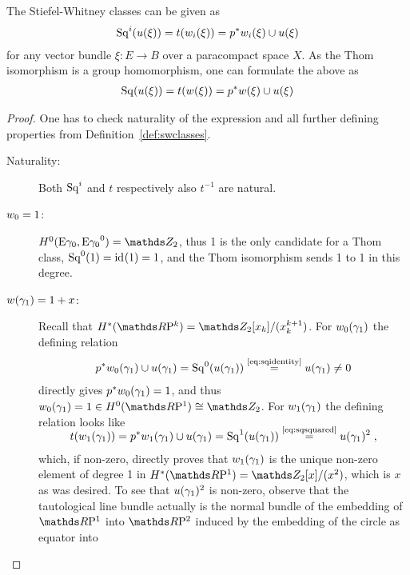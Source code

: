 \begin{Thm}\label{thm:altdefswclasses}
  The Stiefel-Whitney classes can be given as
  \begin{gather*}
    \mathrm{Sq}^{i}({u}(\xi)) = t({w_{i}}(\xi)) = {p}^* {w_{i}}(\xi) \cup {u}(\xi)
  \end{gather*}
  for any vector bundle $\xi\colon E\to B$ over a paracompact space
  $X$. As the Thom isomorphism is a group homomorphism, one can
  formulate the above as
  \begin{gather*}
    \mathrm{Sq}({u}(\xi)) = t({w}(\xi)) = {p}^* {w}(\xi) \cup {u}(\xi)
  \end{gather*}
  \begin{proof}
    One has to check naturality of the expression and all further
    defining properties from Definition~\ref{def:swclasses}.
    \begin{description}
    \item[Naturality:] Both $\mathrm{Sq}^{i}$ and $t$ respectively also $t^{-1}$
      are natural.
    \item[$w_{0}=1$:]
      $\H^0(\thomspacepair{\E{\gamma_0}}) = \Zmod2$, thus 1 is the only
      candidate for a Thom class, $\mathrm{Sq}^{0}(1) = \mathrm{id}_{}(1) = 1$, and the Thom
      isomorphism sends 1 to 1 in this degree.
    \item[${w}(\gamma_1)=1+x$:]
      Recall that $\H^*(\RP k)=\Zmod2[x_k]/(x_k^{k+1})$.
      For ${w_{0}}(\gamma_1)$ the defining relation
      \begin{gather*}
        {p}^*{w_{0}}(\gamma_1)\cup{u}(\gamma_1)
        = \mathrm{Sq}^{0}({u}(\gamma_1))
        \overset{\text{\eqref{eq:sqidentity}}}={u}(\gamma_1) \neq 0
      \end{gather*}
      directly gives
      ${p}^*{w_{0}}(\gamma_1)=1$, and thus
      $\w{0}{\gamma_1}=1\in\H^0(\RP1)\cong\Zmod2$.
      For ${w_{1}}(\gamma_1)$ the defining relation looks like
      \begin{gather*}
        \SwapAboveDisplaySkip
        \thomiso(\w{1}{\gamma_1})
        = \pb p\w{1}{\gamma_1}\cup \u{\gamma_1}
        = \Sq 1(\u{\gamma_1})
        \cequalsby{\eqref{eq:sqsquared}}\u{\gamma_1}^2
        \;,
      \end{gather*}
      which, if non-zero, directly proves that ${w_{1}}(\gamma_1)$ is
      the unique non-zero element of degree 1 in
      $\H^*(\RP1)=\Zmod2[x]/(x^2)$, which is $x$ as was desired.
      To see that ${u}(\gamma_1)^2$ is non-zero,
      observe that the tautological line bundle
      actually is the normal bundle of the embedding of $\RP1$ into
      $\RP2$ induced by the embedding of the circle as equator into

\end{description}
\end{proof}
\end{Thm}
